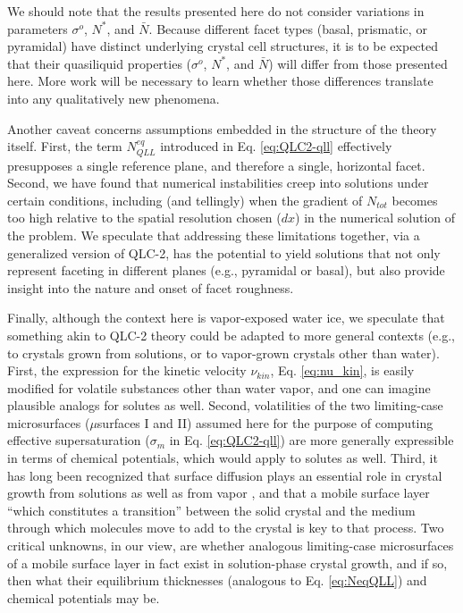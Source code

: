 \documentclass[draft]{agujournal2019}
\begin{document}
We should note that the results presented here do not consider variations in parameters $\sigma^o$, $N^*$, and $\bar{N}$. Because different facet types (basal, prismatic, or pyramidal) have distinct underlying crystal cell structures, it is to be expected that their quasiliquid properties ($\sigma^o$, $N^*$, and $\bar{N}$) will differ from those presented here. More work will be necessary to learn whether those differences translate into any qualitatively new phenomena.

Another caveat concerns assumptions embedded in the structure of the theory itself. First, the term $N_{QLL}^{eq}$ introduced in Eq. \ref{eq:QLC2-qll} effectively presupposes a single reference plane, and therefore a single, horizontal facet. Second, we have found that numerical instabilities creep into solutions under certain conditions, including (and tellingly) when the gradient of $N_{tot}$ becomes too high relative to the spatial resolution chosen ($dx$) in the numerical solution of the problem. We speculate that addressing these limitations together, via a generalized version of QLC-2, has the potential to yield solutions that not only represent faceting in different planes (e.g., pyramidal or basal), but also provide insight into the nature and onset of facet roughness.

Finally, although the context here is vapor-exposed water ice, we speculate that something akin to QLC-2 theory could be adapted to more general contexts (e.g., to crystals grown from solutions, or to vapor-grown crystals other than water). First, the expression for the kinetic velocity $\nu_{kin}$, Eq. \ref{eq:nu_kin}, is easily modified for volatile substances other than water vapor, and one can imagine plausible analogs for solutes as well. Second,  volatilities of the two limiting-case microsurfaces ($\mu$surfaces I and II) assumed here for the purpose of computing effective supersaturation ($\sigma_m$ in Eq. \ref{eq:QLC2-qll}) are more generally expressible in terms of chemical potentials, which would apply to solutes as well. Third, it has long been recognized that surface diffusion plays an essential role in crystal growth from solutions as well as from vapor \cite{bennema_importance_1969,burton_growth_1951}, and that a mobile surface layer ``which constitutes a transition'' between the solid crystal and the medium through which molecules move to add to the crystal  \cite{berg_crystal_1938} is key to that process. Two critical unknowns, in our view, are whether analogous limiting-case microsurfaces of a mobile surface layer in fact exist in solution-phase crystal growth, and if so, then what their equilibrium thicknesses (analogous to Eq. \ref{eq:NeqQLL}) and chemical potentials may be.
\end{document}
